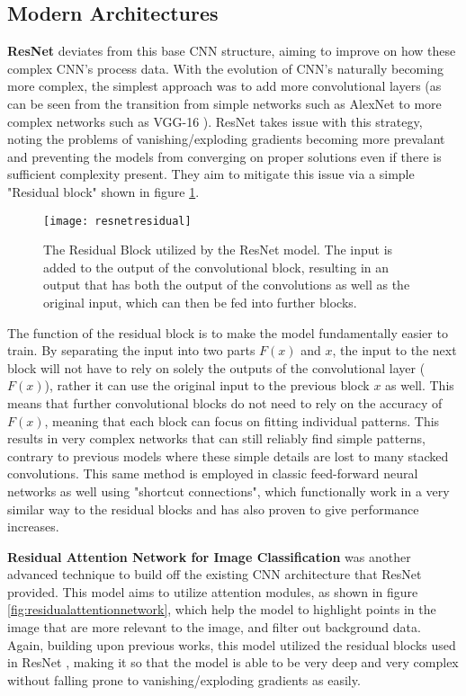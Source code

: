 \subsection{Modern Architectures}

\textbf{ResNet} \cite{resnet} deviates from this base CNN structure, aiming to improve on how these complex CNN's process data. With the evolution of CNN's naturally becoming more complex, the simplest approach was to add more convolutional layers (as can be seen from the transition from simple networks such as AlexNet \cite{alexnet} to more complex networks such as VGG-16 \cite{vgg16}). ResNet takes issue with this strategy, noting the problems of vanishing/exploding gradients becoming more prevalant and preventing the models from converging on proper solutions even if there is sufficient complexity present. They aim to mitigate this issue via a simple "Residual block" shown in figure \ref{fig:resnetresidual}.

\begin{figure}[ht]
	\texttt{[image: resnetresidual]}
	\centering
	\caption{The Residual Block utilized by the ResNet \cite{resnet} model. The input is added to the output of the convolutional block, resulting in an output that has both the output of the convolutions as well as the original input, which can then be fed into further blocks.}
	\label{fig:resnetresidual}
\end{figure}

The function of the residual block is to make the model fundamentally easier to train. By separating the input into two parts $F(x)$ and $x$, the input to the next block will not have to rely on solely the outputs of the convolutional layer ($F(x)$), rather it can use the original input to the previous block $x$ as well. This means that further convolutional blocks do not need to rely on the accuracy of $F(x)$, meaning that each block can focus on fitting individual patterns. This results in very complex networks that can still reliably find simple patterns, contrary to previous models where these simple details are lost to many stacked convolutions. This same method is employed in classic feed-forward neural networks as well using "shortcut connections", which functionally work in a very similar way to the residual blocks and has also proven to give performance increases.

\textbf{Residual Attention Network for Image Classification} \cite{residualattentionnetwork} was another advanced technique to build off the existing CNN architecture that ResNet provided. This model aims to utilize attention modules, as shown in figure \ref{fig:residualattentionnetwork}, which help the model to highlight points in the image that are more relevant to the image, and filter out background data. Again, building upon previous works, this model utilized the residual blocks used in ResNet \cite{resnet}, making it so that the model is able to be very deep and very complex without falling prone to vanishing/exploding gradients as easily.

